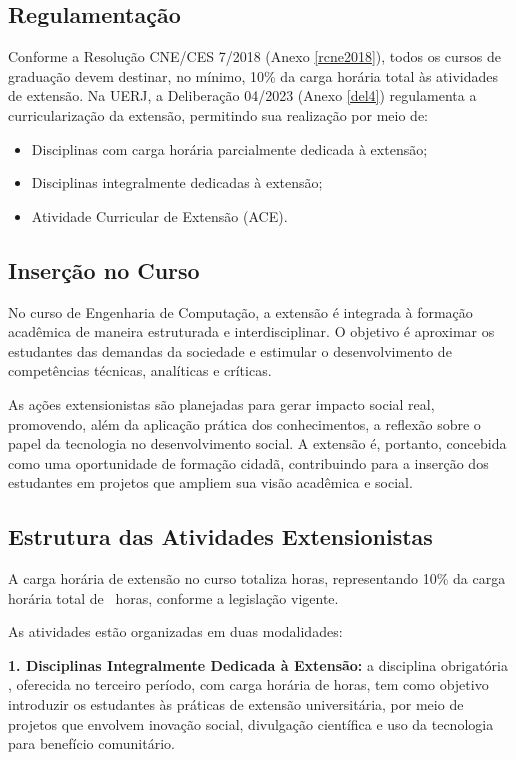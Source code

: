 \subsection{Regulamentação}
Conforme a Resolução CNE/CES  7/2018 (Anexo \ref{rcne2018}), todos os cursos de graduação devem destinar, no mínimo, 10\% da carga horária total às atividades de extensão. Na UERJ, a Deliberação  04/2023 (Anexo \ref{del4}) regulamenta a curricularização da extensão, permitindo sua realização por meio de:

\begin{itemize}
    \item Disciplinas com carga horária parcialmente dedicada à extensão;
    \item Disciplinas integralmente dedicadas à extensão;
    \item Atividade Curricular de Extensão (ACE).
\end{itemize}

\subsection{Inserção no Curso}

No curso de Engenharia de Computação, a extensão é integrada à formação acadêmica de maneira estruturada e interdisciplinar. O objetivo é aproximar os estudantes das demandas da sociedade e estimular o desenvolvimento de competências técnicas, analíticas e críticas.

As ações extensionistas são planejadas para gerar impacto social real, promovendo, além da aplicação prática dos conhecimentos, a reflexão sobre o papel da tecnologia no desenvolvimento social. A extensão é, portanto, concebida como uma oportunidade de formação cidadã, contribuindo para a inserção dos estudantes em projetos que ampliem sua visão acadêmica e social.

\subsection{Estrutura das Atividades Extensionistas}

A carga horária de extensão no curso totaliza \hExtensao horas, representando 10\% da carga horária total de \tHorasCurso\ horas, conforme a legislação vigente.

As atividades estão organizadas em duas modalidades:

\textbf{1. Disciplinas Integralmente Dedicada à Extensão:}
a disciplina obrigatória \textbf{\Ext}, oferecida no terceiro período, com carga horária de \ExtCH{ } horas, tem como objetivo introduzir os estudantes às práticas de extensão universitária, por meio de projetos que envolvem inovação social, divulgação científica e uso da tecnologia para benefício comunitário.

